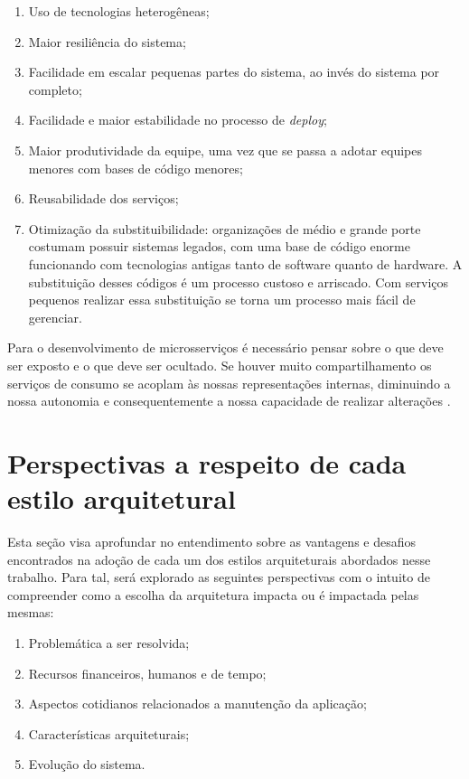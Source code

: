\begin{enumerate}
    \item{Uso de tecnologias heterogêneas;}
    \item{Maior resiliência do sistema;}
    \item{Facilidade em escalar pequenas partes do sistema, ao invés do sistema por
    completo;}
    \item{Facilidade e maior estabilidade no processo de \textit{deploy};}
    \item{Maior produtividade da equipe, uma vez que se passa a adotar equipes
    menores com bases de código menores;}
    \item{Reusabilidade dos serviços;}
    \item{Otimização da substituibilidade: organizações de médio e grande porte costumam
    possuir sistemas legados, com uma base de código enorme funcionando com tecnologias
    antigas tanto de software quanto de hardware. A substituição desses códigos é um
    processo custoso e arriscado. Com serviços pequenos realizar essa substituição
    se torna um processo mais fácil de gerenciar.}
\end{enumerate}

Para o desenvolvimento de microsserviços é necessário pensar sobre o que deve ser
exposto e o que deve ser ocultado. Se houver muito compartilhamento os serviços de
consumo se acoplam às nossas representações internas, diminuindo a nossa autonomia
e consequentemente a nossa capacidade de realizar alterações \cite{Newman2015}.

\section{Perspectivas a respeito de cada estilo arquitetural}

Esta seção visa aprofundar no entendimento sobre as vantagens e desafios encontrados na adoção
de cada um dos estilos arquiteturais abordados nesse trabalho. Para tal, será explorado as seguintes
perspectivas com o intuito de compreender como a escolha da arquitetura impacta ou é impactada pelas
mesmas:

\begin{enumerate}
    \item Problemática a ser resolvida;
    \item Recursos financeiros, humanos e de tempo;
    \item Aspectos cotidianos relacionados a manutenção da aplicação;
    \item Características arquiteturais;
    \item Evolução do sistema.
\end{enumerate}

